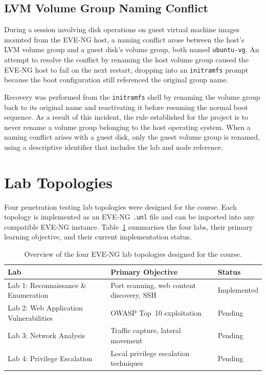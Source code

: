 \subsection{LVM Volume Group Naming Conflict}

During a session involving disk operations on guest virtual machine images mounted
from the EVE-NG host, a naming conflict arose between the host's LVM volume group
and a guest disk's volume group, both named \texttt{ubuntu-vg}. An attempt to
resolve the conflict by renaming the host volume group caused the EVE-NG host to
fail on the next restart, dropping into an \texttt{initramfs} prompt because the
boot configuration still referenced the original group name.

Recovery was performed from the \texttt{initramfs} shell by renaming the volume
group back to its original name and reactivating it before resuming the normal boot
sequence. As a result of this incident, the rule established for the project is to
never rename a volume group belonging to the host operating system. When a naming
conflict arises with a guest disk, only the guest volume group is renamed, using a
descriptive identifier that includes the lab and node reference.


\section{Lab Topologies}

Four penetration testing lab topologies were designed for the course. Each topology
is implemented as an EVE-NG \texttt{.unl} file and can be imported into any
compatible EVE-NG instance. Table~\ref{tab:lab-overview} summarises the four labs,
their primary learning objective, and their current implementation status.

\begin{table}[h]
\centering
\begin{tabular}{|l|l|l|}
\hline
\textbf{Lab} & \textbf{Primary Objective} & \textbf{Status} \\
\hline
Lab 1: Reconnaissance \& Enumeration & Port scanning, web content discovery, SSH & Implemented \\
Lab 2: Web Application Vulnerabilities & OWASP Top~10 exploitation~\cite{owasp2021}              & Pending \\
Lab 3: Network Analysis                & Traffic capture, lateral movement       & Pending \\
Lab 4: Privilege Escalation            & Local privilege escalation techniques   & Pending \\
\hline
\end{tabular}
\caption{Overview of the four EVE-NG lab topologies designed for the course.}
\label{tab:lab-overview}
\end{table}

